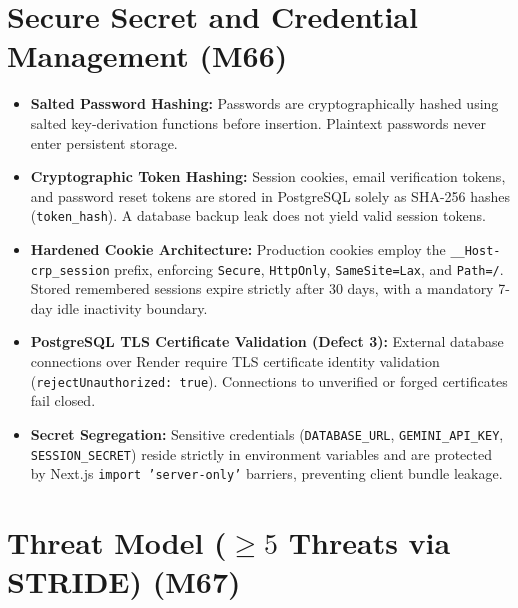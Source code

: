 \documentclass[10pt]{article}
\begin{document}
\section{Secure Secret and Credential Management (M66)}
\begin{itemize}
  \item \textbf{Salted Password Hashing:} Passwords are cryptographically hashed using salted key-derivation functions before insertion. Plaintext passwords never enter persistent storage.
  \item \textbf{Cryptographic Token Hashing:} Session cookies, email verification tokens, and password reset tokens are stored in PostgreSQL solely as SHA-256 hashes (\texttt{token\_hash}). A database backup leak does not yield valid session tokens.
  \item \textbf{Hardened Cookie Architecture:} Production cookies employ the \texttt{\_\_Host-crp\_session} prefix, enforcing \texttt{Secure}, \texttt{HttpOnly}, \texttt{SameSite=Lax}, and \texttt{Path=/}. Stored remembered sessions expire strictly after 30 days, with a mandatory 7-day idle inactivity boundary.
  \item \textbf{PostgreSQL TLS Certificate Validation (Defect 3):} External database connections over Render require TLS certificate identity validation (\texttt{rejectUnauthorized: true}). Connections to unverified or forged certificates fail closed.
  \item \textbf{Secret Segregation:} Sensitive credentials (\texttt{DATABASE\_URL}, \texttt{GEMINI\_API\_KEY}, \texttt{SESSION\_SECRET}) reside strictly in environment variables and are protected by Next.js \texttt{import 'server-only'} barriers, preventing client bundle leakage.
\end{itemize}

\section{Threat Model ($\ge 5$ Threats via STRIDE) (M67)}
\end{document}
